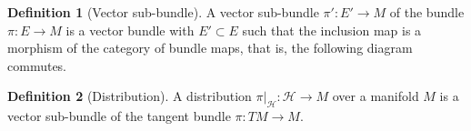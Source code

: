 \documentclass [xcolor=svgnames, t] {beamer}
\theoremstyle{definition}
\newtheorem{df}{Definition}
\theoremstyle{plain}
\theoremstyle{remark}
\begin{document}
\begin{frame}[fragile]
	\begin{df}[Vector sub-bundle]
		A vector sub-bundle $ \pi': E' \rightarrow M $  of the bundle $ \pi: E \rightarrow M $ is a vector bundle with $ E'\subset E $ such that the inclusion map is a morphism of the category of bundle maps, that is, the following diagram commutes.
		\begin{center}
		\end{center}
	\end{df}
	\begin{df}[Distribution]
		A distribution $ \pi|_{ \mathcal{H}}:\mathcal{H} \rightarrow M $ over a manifold $ M $ is a vector sub-bundle of the tangent bundle $ \pi:TM \rightarrow M. $ 
	\end{df}
\end{frame}
\end{document}
